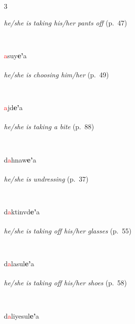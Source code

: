\documentclass[oneside,openany]{book}%
\begin{document}
\begin{multicols}{3}
\begin{minipage}[t]{\linewidth}
\noindent \textit{he/she is taking his/her pants off} (p.~47)
\end{minipage}\\[1em]%
\begin{minipage}[t]{\linewidth}
\raggedright\noindent \textcolor{Red}{a}suy\textbf{e'}a\\
\\
\noindent \textit{he/she is choosing him/her} (p.~49)
\end{minipage}\\[1em]%
\begin{minipage}[t]{\linewidth}
\raggedright\noindent \textcolor{Red}{a}jd\textbf{e'}a\\
\\
\noindent \textit{he/she is taking a bite} (p.~88)
\end{minipage}\\[1em]%
\begin{minipage}[t]{\linewidth}
\raggedright\noindent d\textcolor{Red}{a}hnaw\textbf{e'}a\\
\\
\noindent \textit{he/she is undressing} (p.~37)
\end{minipage}\\[1em]%
\begin{minipage}[t]{\linewidth}
\raggedright\noindent d\textcolor{Red}{a}ktinvd\textbf{e'}a\\
\\
\noindent \textit{he/she is taking off his/her glasses} (p.~55)
\end{minipage}\\[1em]%
\begin{minipage}[t]{\linewidth}
\raggedright\noindent d\textcolor{Red}{a}lasul\textbf{e'}a\\
\\
\noindent \textit{he/she is taking off his/her shoes} (p.~58)
\end{minipage}\\[1em]%
\begin{minipage}[t]{\linewidth}
\raggedright\noindent d\textcolor{Red}{a}liyesul\textbf{e'}a\\

\end{minipage}
\end{multicols}
\end{document}
